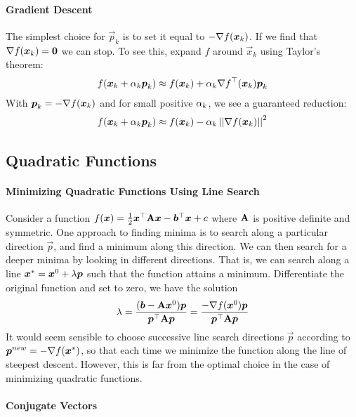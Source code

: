 \paragraph{Gradient Descent}

The simplest choice for $\vec{p}_k$ is to set it equal to $-\nabla f(\boldsymbol{x}_k)$. If we find that $\nabla f(\boldsymbol{x}_k)=\boldsymbol{0}$ we can stop. To see this, expand $f$ around $\vec{x}_k$ using Taylor's theorem:
\begin{align*}
	f(\boldsymbol{x}_k+\alpha_k\boldsymbol{p}_k)\approx f(\boldsymbol{x}_k)+\alpha_k\nabla f^\top(\boldsymbol{x}_k)\boldsymbol{p}_k
\end{align*}
With $\boldsymbol{p}_k=-\nabla f(\boldsymbol{x}_k)$ and for small positive $\alpha_k$, we see a guaranteed reduction:
\begin{align*}
	f(\boldsymbol{x}_k+\alpha_k\boldsymbol{p}_k)\approx f(\boldsymbol{x}_k)-\alpha_k\left\vert\left\vert \nabla f(\boldsymbol{x}_k) \right\vert\right\vert^2
\end{align*}

\subsection{Quadratic Functions}

\paragraph{Minimizing Quadratic Functions Using Line Search}

Consider a function $f(\boldsymbol{x})=\frac{1}{2}\boldsymbol{x}{}^\top\mathbf{A}\boldsymbol{x}-\boldsymbol{b}{}^\top\boldsymbol{x}+c$ where $\mathbf{A}$ is positive definite and symmetric. One approach to finding minima is to search along a particular direction $\vec{p}$, and find a minimum along this direction. We can then search for a deeper minima by looking in different directions. That is, we can search along a line $\boldsymbol{x}^*=\boldsymbol{x}^0+\lambda\boldsymbol{p}$ such that the function attains a minimum. Differentiate the original function and set to zero, we have the solution
\begin{align*}
	\lambda=\frac{(\boldsymbol{b}-\mathbf{A}\boldsymbol{x}^0)\boldsymbol{p}}{\boldsymbol{p}{}^\top\mathbf{A}\boldsymbol{p}}=\frac{-\nabla f(\boldsymbol{x}^0)\boldsymbol{p}}{\boldsymbol{p}{}^\top\mathbf{A}\boldsymbol{p}}
\end{align*}
It would seem sensible to choose successive line search directions $\vec{p}$ according to $\boldsymbol{p}^{new}=-\nabla f(\boldsymbol{x}^*)$, so that each time we minimize the function along the line of steepest descent. However, this is far from the optimal choice in the case of minimizing quadratic functions.

\paragraph{Conjugate Vectors}

